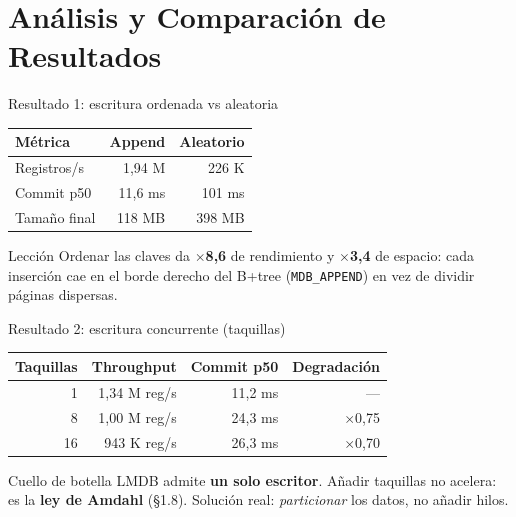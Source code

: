 \documentclass[aspectratio=169,11pt]{beamer}
\begin{document}
\section{Análisis y Comparación de Resultados}

\begin{frame}{Resultado 1: escritura ordenada vs aleatoria}
  \begin{table}
    \centering
    \begin{tabular}{@{}lrr@{}}
      \toprule
      \textbf{Métrica} & \textbf{Append} & \textbf{Aleatorio} \\
      \midrule
      Registros/s & 1{,}94 M & 226 K \\
      Commit p50 & 11{,}6 ms & 101 ms \\
      Tamaño final & 118 MB & 398 MB \\
      \bottomrule
    \end{tabular}
  \end{table}

  \vspace{0.3cm}
  \begin{block}{Lección}
    Ordenar las claves da \textbf{$\times$8,6} de rendimiento y
    \textbf{$\times$3,4} de espacio: cada inserción cae en el borde derecho
    del B+tree (\texttt{MDB\_APPEND}) en vez de dividir páginas dispersas.
  \end{block}
\end{frame}

\begin{frame}{Resultado 2: escritura concurrente (taquillas)}
  \begin{table}
    \centering
    \begin{tabular}{@{}rrrr@{}}
      \toprule
      \textbf{Taquillas} & \textbf{Throughput} & \textbf{Commit p50} & \textbf{Degradación} \\
      \midrule
      1 & 1{,}34 M reg/s & 11{,}2 ms & --- \\
      8 & 1{,}00 M reg/s & 24{,}3 ms & $\times$0{,}75 \\
      16 & 943 K reg/s & 26{,}3 ms & $\times$0{,}70 \\
      \bottomrule
    \end{tabular}
  \end{table}

  \vspace{0.3cm}
  \begin{alertblock}{Cuello de botella}
    LMDB admite \textbf{un solo escritor}. Añadir taquillas no acelera: es la
    \textbf{ley de Amdahl} (\S1.8). Solución real: \emph{particionar} los
    datos, no añadir hilos.
  \end{alertblock}
\end{frame}
\end{document}
